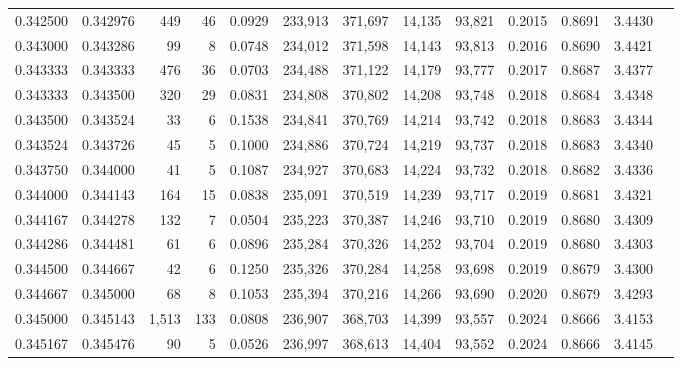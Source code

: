 \begin{tabular}{rrrrrrrrrrrrr}
0.342500 & 0.342976 &   449 &  46 &                                     0.0929 & 233,913 & 371,697 &  14,135 &  93,821 & 0.2015 & 0.8691 & 3.4430 \\
0.343000 & 0.343286 &    99 &   8 &                                     0.0748 & 234,012 & 371,598 &  14,143 &  93,813 & 0.2016 & 0.8690 & 3.4421 \\
0.343333 & 0.343333 &   476 &  36 &                                     0.0703 & 234,488 & 371,122 &  14,179 &  93,777 & 0.2017 & 0.8687 & 3.4377 \\
0.343333 & 0.343500 &   320 &  29 &                                     0.0831 & 234,808 & 370,802 &  14,208 &  93,748 & 0.2018 & 0.8684 & 3.4348 \\
0.343500 & 0.343524 &    33 &   6 &                                     0.1538 & 234,841 & 370,769 &  14,214 &  93,742 & 0.2018 & 0.8683 & 3.4344 \\
0.343524 & 0.343726 &    45 &   5 &                                     0.1000 & 234,886 & 370,724 &  14,219 &  93,737 & 0.2018 & 0.8683 & 3.4340 \\
0.343750 & 0.344000 &    41 &   5 &                                     0.1087 & 234,927 & 370,683 &  14,224 &  93,732 & 0.2018 & 0.8682 & 3.4336 \\
0.344000 & 0.344143 &   164 &  15 &                                     0.0838 & 235,091 & 370,519 &  14,239 &  93,717 & 0.2019 & 0.8681 & 3.4321 \\
0.344167 & 0.344278 &   132 &   7 &                                     0.0504 & 235,223 & 370,387 &  14,246 &  93,710 & 0.2019 & 0.8680 & 3.4309 \\
0.344286 & 0.344481 &    61 &   6 &                                     0.0896 & 235,284 & 370,326 &  14,252 &  93,704 & 0.2019 & 0.8680 & 3.4303 \\
0.344500 & 0.344667 &    42 &   6 &                                     0.1250 & 235,326 & 370,284 &  14,258 &  93,698 & 0.2019 & 0.8679 & 3.4300 \\
0.344667 & 0.345000 &    68 &   8 &                                     0.1053 & 235,394 & 370,216 &  14,266 &  93,690 & 0.2020 & 0.8679 & 3.4293 \\
0.345000 & 0.345143 & 1,513 & 133 &                                     0.0808 & 236,907 & 368,703 &  14,399 &  93,557 & 0.2024 & 0.8666 & 3.4153 \\
0.345167 & 0.345476 &    90 &   5 &                                     0.0526 & 236,997 & 368,613 &  14,404 &  93,552 & 0.2024 & 0.8666 & 3.4145 \\

\end{tabular}
